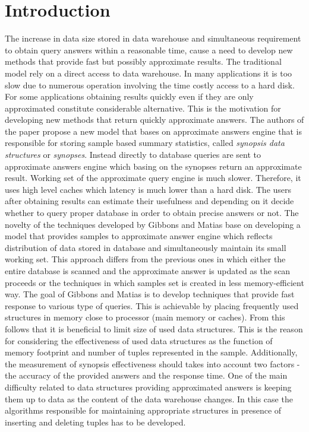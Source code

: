 \section{Introduction}
The increase in data size stored in data warehouse and simultaneous
requirement to obtain query answers within a reasonable time, cause a
need to develop new methods that provide fast but possibly approximate
results. The traditional model rely on a direct access to data
warehouse. In many applications it is too slow due to numerous
operation involving the time costly access to a hard disk. For some applications
obtaining results quickly even if they are only approximated
constitute considerable alternative.
This is the motivation for developing new methods that return quickly
approximate answers. The authors of the paper \cite{GM98} propose a
new model that bases on
approximate answers engine that is responsible for storing sample based summary statistics,
called \textit{synopsis data structures} or \textit{synopses}. Instead
directly to database queries are sent to approximate answers
engine which basing on the synopses return an approximate result.
Working set of the approximate query engine is much slower. Therefore,
it uses high level caches which latency is much lower than a hard disk.
The users after obtaining results can estimate their usefulness and depending on it
decide whether to query proper database in order to obtain precise answers or not.
The novelty of the techniques developed by Gibbons and Matias
\cite{GM98} base on developing a model that provides samples to
approximate answer engine which reflects distribution of
data stored in database and simultaneously maintain its small working set.
This approach differs from the previous ones in which either the
entire database is scanned and the approximate answer is updated as
the scan proceeds or the techniques in which samples set is created in
less memory-efficient way. The goal of Gibbons and Matias \cite{GM98}
is to develop techniques that provide fast response to various type of
queries. This is achievable by placing frequently used structures in
memory close to processor (main memory or caches). From this follows
that it is beneficial to limit size of used data structures. This is
the reason for considering the effectiveness of used data structures
as the function of memory footprint and number of tuples represented
in the sample. Additionally, the measurement of synopsis effectiveness
should takes into account two factors - the
accuracy of the provided answers and the response time. One of the main
difficulty related to data structures providing approximated answers is
keeping them up to data as the content of the  data warehouse changes.
In this case the algorithms responsible for maintaining appropriate
structures in presence of inserting and deleting tuples has to be
developed.

